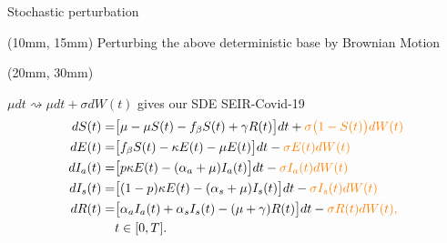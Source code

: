 \begin{frame}{Stochastic perturbation}
	\begin{textblock*}{60mm}(10mm, 15mm)
		Perturbing the above deterministic base by Brownian Motion
	\end{textblock*}
	\begin{textblock*}{100mm}(20mm, 30mm)
		\begin{graybox}{
				$\mu dt\rightsquigarrow \mu dt + \sigma dW(t)$ gives
				our SDE SEIR-Covid-19
			}
			\begin{equation*}
				\begin{aligned}
					d {S}(t)  =&
					\big[\mu - \mu S(t) - f_{\beta} S(t)
					+\gamma R(t)  \big] dt 
					+ \color{orange}{
						\sigma \big(1- S(t)\big) dW(t)
					}
					\\
					d {E}(t) =& \big[  f_{\beta} S(t)
					- \kappa  E(t) - \mu E(t) \big] dt  
					- \color{orange}{
						\sigma E(t) dW(t)
					}
					\\
					d {I_a}(t) =& \big[
					p \kappa E(t)
					-   (\alpha_a +\mu) I_a(t)  \big] dt  
					- \color{orange}{
						\sigma I_a(t) dW(t)
					}
					\\
					d {I_s}(t) =& \big[
					(1 - p) \kappa E (t)
					- (\alpha_s +\mu)  I_s(t) \big] dt   
					- \color{orange}{
						\sigma I_s(t) dW(t)
					}
					\\
					d {R}(t) =&
					\big[
					\alpha_a I_a(t) +
					\alpha_s I_s(t) - (\mu + \gamma) R(t)
					\big] dt
					- 
					\color{orange}{
						\sigma R(t) dW(t)
					},
					\\
					& t \in  [0, T] .
				\end{aligned}
			\end{equation*}
		\end{graybox}
	\end{textblock*}
\end{frame}
